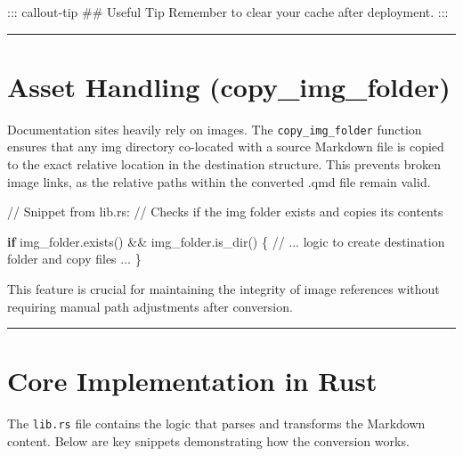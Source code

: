 \documentclass[
  letterpaper,
  DIV=11,
  numbers=noendperiod]{scrreprt}
\newenvironment{Shaded}{\begin{snugshade}}{\end{snugshade}}
\newcommand{\CommentTok}[1]{\textcolor[rgb]{0.37,0.37,0.37}{#1}}
\newcommand{\ControlFlowTok}[1]{\textcolor[rgb]{0.00,0.23,0.31}{\textbf{#1}}}
\newcommand{\FunctionTok}[1]{\textcolor[rgb]{0.28,0.35,0.67}{#1}}
\newcommand{\NormalTok}[1]{\textcolor[rgb]{0.00,0.23,0.31}{#1}}
\newcommand{\OperatorTok}[1]{\textcolor[rgb]{0.37,0.37,0.37}{#1}}
\begin{document}
\begin{Shaded}
\begin{Highlighting}[]
\NormalTok{::: callout{-}tip}
\FunctionTok{\#\# Useful Tip}
\NormalTok{Remember to clear your cache after deployment.}
\NormalTok{:::}
\end{Highlighting}
\end{Shaded}

\begin{center}\rule{0.5\linewidth}{0.5pt}\end{center}

\chapter{Asset Handling
(copy\_img\_folder)}\label{asset-handling-copy_img_folder}

Documentation sites heavily rely on images. The
\texttt{copy\_img\_folder} function ensures that any img directory
co-located with a source Markdown file is copied to the exact relative
location in the destination structure. This prevents broken image links,
as the relative paths within the converted .qmd file remain valid.

\begin{Shaded}
\begin{Highlighting}[]
\CommentTok{// Snippet from lib.rs: }
\CommentTok{// Checks if the \textquotesingle{}img\textquotesingle{} folder exists and copies its contents }

\ControlFlowTok{if}\NormalTok{ img\_folder}\OperatorTok{.}\NormalTok{exists() }\OperatorTok{\&\&}\NormalTok{ img\_folder}\OperatorTok{.}\NormalTok{is\_dir() }
  \OperatorTok{\{} \CommentTok{// ... logic to create destination folder and copy files ... \}}
\end{Highlighting}
\end{Shaded}

This feature is crucial for maintaining the integrity of image
references without requiring manual path adjustments after conversion.

\begin{center}\rule{0.5\linewidth}{0.5pt}\end{center}

\chapter{Core Implementation in Rust}\label{core-implementation-in-rust}

The \texttt{lib.rs} file contains the logic that parses and transforms
the Markdown content. Below are key snippets demonstrating how the
conversion works.
\end{document}
